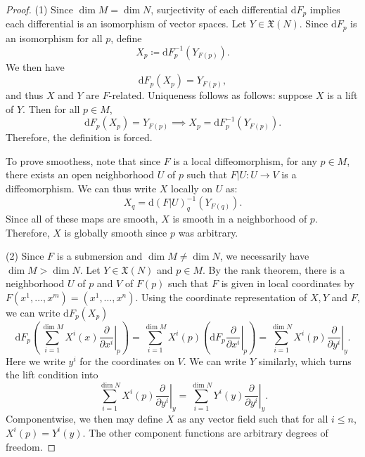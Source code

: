 \documentclass[11pt, letterpaper]{article}
\begin{document}
\begin{proof}
	(1) Since $\dim M=\dim N$, surjectivity of each differential $\mathrm{d} F_p$ implies each differential is an isomorphism of vector spaces. Let $Y\in \mathfrak{X} (N)$. Since $\mathrm{d} F_p$ is an isomorphism for all $p$, define
	\[
		X_p \coloneqq \mathrm{d} F_p ^{-1} (Y_{F(p)} )
	.\]
	We then have
	\[
		\mathrm{d} F_p(X_p)=Y_{F(p)} ,
	\]
	and thus $X$ and $Y$ are $F$-related. Uniqueness follows as follows: suppose $X$ is a lift of $Y$. Then for all $p\in M$,
	\[
		\mathrm{d} F_p(X_p)=Y_{F(p)} \implies X_p=\mathrm{d} F^{-1} _p (Y_{F(p)} )
	.\]
	Therefore, the definition is forced.

	To prove smoothess, note that since $F$ is a local diffeomorphism, for any $p \in M$, there exists an open neighborhood $U$ of $p$ such that $F|U: U \to V$ is a diffeomorphism. We can thus write $X$ locally on $U$ as:
\[
X_q = \mathrm{d} (F|U)_q^{-1}(Y_{F(q)})
.\]
Since all of these maps are smooth, $X$ is smooth in a neighborhood of $p$. Therefore, $X$ is globally smooth since $p$ was arbitrary.

(2) Since $F$ is a submersion and $\dim M\neq \dim N$, we necessarily have $\dim M > \dim N$. Let $Y\in \mathfrak{X}(N)$ and $p\in M$. By the rank theorem, there is a neighborhood $U$ of $p$ and $V$ of $F(p)$ such that $F$ is given in local coordinates by $F(x^1, \ldots ,x^m) = (x^1, \ldots ,x^n)$. Using the coordinate representation of $X,Y$ and $F$, we can write $\mathrm{d} F_p(X_p)$
\[
	\mathrm{d} F_p\left( \sum_{i=1}^{\dim M} X^i(x) \left.\frac{\partial }{\partial x^i} \right|_p \right) =\sum_{i=1}^{\dim M} X^i(p)\left( \mathrm{d} F_p \left. \frac{\partial }{\partial x^i} \right|_p \right) =\sum_{i=1}^{\dim N} X^i(p) \left.\frac{\partial }{\partial y^i} \right|_{y} 
.\]
Here we write $y^i$ for the coordinates on $V$. We can write $Y$ similarly, which turns the lift condition into
\[
	\sum_{i=1}^{\dim N} X^i(p) \left.\frac{\partial }{\partial y^i} \right|_{y}=\sum_{i=1}^{\dim N} Y^i(y)\left.\frac{\partial }{\partial y^i} \right|_y
.\]
Componentwise, we then may define $X$ as any vector field such that for all $i\leq n$, $X^i(p)=Y^i(y)$. The other component functions are arbitrary degrees of freedom.


\end{proof}
\end{document}

